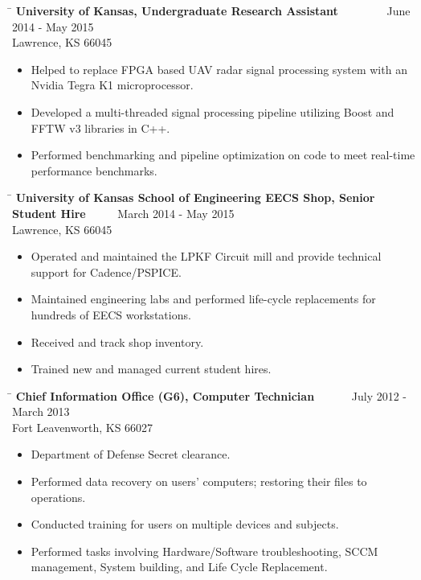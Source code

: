 \documentclass{res}
\begin{document}
\begin{resume}
\begin{tabbing}
   \hspace{5.5in}\= \kill
    {\bf University of Kansas, Undergraduate Research Assistant} \>~~~~~~~~June 2014 - May 2015\\
    Lawrence, KS 66045
   \end{tabbing}\vspace{-10pt}
	\begin{itemize}
		\item Helped to replace FPGA based UAV radar signal processing system with an Nvidia Tegra K1 microprocessor.
		\item Developed a multi-threaded signal processing pipeline utilizing Boost and FFTW v3 libraries in C++.
		\item Performed benchmarking and pipeline optimization on code to meet real-time performance benchmarks.\vspace{-15pt}
	\end{itemize}
   \begin{tabbing}
   \hspace{5.5in}\= \kill
   {\bf University of Kansas School of Engineering EECS Shop, Senior Student Hire}  \>~~~~~March 2014 - May 2015\\
   Lawrence, KS 66045
   \end{tabbing}\vspace{-10pt}
	\begin{itemize}
		\item Operated and maintained the LPKF Circuit mill and provide technical support for Cadence/PSPICE.
		\item Maintained engineering labs and performed life-cycle replacements for hundreds of EECS workstations.
		\item Received and track shop inventory.
		\item Trained new and managed current student hires.\vspace{-15pt}
	\end{itemize}
   \begin{tabbing}
	\hspace{5.5in}\= \kill
	{\bf Chief Information Office (G6), Computer Technician}  \>~~~~~~July 2012 - March 2013\\
	Fort Leavenworth, KS 66027
\end{tabbing}\vspace{-10pt}
	\begin{itemize}
		\item Department of Defense Secret clearance.
		\item Performed data recovery on users' computers; restoring their files to operations.
		\item Conducted training for users on multiple devices and subjects.
		\item Performed tasks involving Hardware/Software troubleshooting, SCCM management, System building, and Life Cycle Replacement.\vspace{-10pt}
	\end{itemize}


\end{resume}
\end{document}
